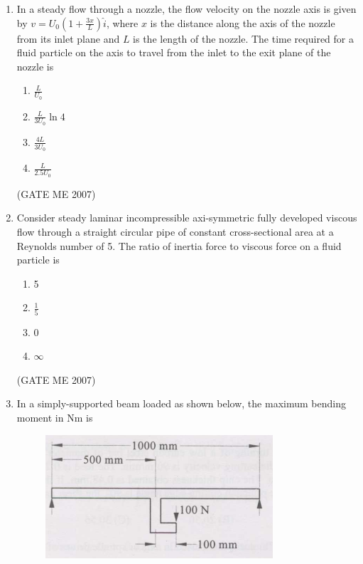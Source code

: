 \documentclass[journal]{IEEEtran}
\begin{document}
\begin{enumerate}
\item In a steady flow through a nozzle, the flow velocity on the nozzle axis is given by $ v = U_0(1 + \frac{3x}{L}) \hat{i} $, where $ x $ is the distance along the axis of the nozzle from its inlet plane and $ L $ is the length of the nozzle. The time required for a fluid particle on the axis to travel from the inlet to the exit plane of the nozzle is
\begin{multicols}{4}
\begin{enumerate}
\item $ \frac{L}{U_0} $
\item $ \frac{L}{3U_0} \ln 4 $
\item $ \frac{4L}{3U_0} $
\item $ \frac{L}{2.5U_0} $
\end{enumerate}
\end{multicols}
\hfill (GATE ME 2007)

\item Consider steady laminar incompressible axi-symmetric fully developed viscous flow through a straight circular pipe of constant cross-sectional area at a Reynolds number of 5. The ratio of inertia force to viscous force on a fluid particle is
\begin{multicols}{4}
\begin{enumerate}
\item 5
\item $ \frac{1}{5} $
\item 0
\item $ \infty $
\end{enumerate}
\end{multicols}
\hfill (GATE ME 2007)

\item In a simply-supported beam loaded as shown below, the maximum bending moment in Nm is

\begin{figure}[H]
    \centering
    \includegraphics[width=0.8\textwidth]{Fig 1.png}
    \caption{}
    \label{fig:question10}
\end{figure}


\end{enumerate}
\end{document}
